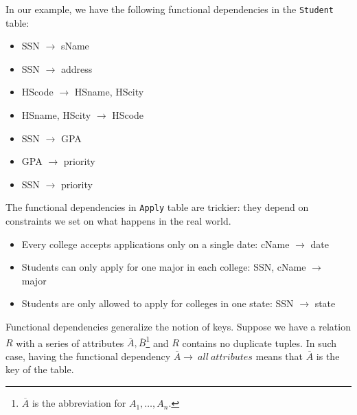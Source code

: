 In our example, we have the following functional dependencies in the \texttt{Student} table:
\begin{itemize}
\item SSN $\rightarrow$ sName
\item SSN $\rightarrow$ address
\item HScode $\rightarrow$ HSname, HScity
\item HSname, HScity $\rightarrow$ HScode
\item SSN $\rightarrow$ GPA
\item GPA $\rightarrow$ priority
\item SSN $\rightarrow$ priority
\end{itemize}
The functional dependencies in \texttt{Apply} table are trickier: they depend on constraints we set on what happens in the real world.
\begin{itemize}
\item Every college accepts applications only on a single date: cName $\rightarrow$ date
\item Students can only apply for one major in each college: SSN, cName $\rightarrow$ major
\item Students are only allowed to apply for colleges in one state: SSN $\rightarrow$ state
\end{itemize}

Functional dependencies generalize the notion of keys. Suppose we have a relation $R$ with a series of attributes ${\overline{A},\overline{B}}$\footnote{$\overline{{A}}$ is the abbreviation for ${A_1,\dots,A_n}$.} and $R$ contains no duplicate tuples. In such case, having the functional dependency ${\overline{A}\rightarrow\:all\:attributes}$ means that ${\overline{A}}$ is the key of the table.

